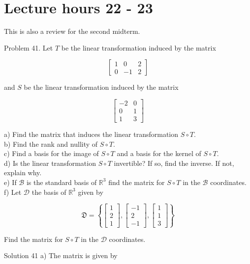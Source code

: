 \documentclass[10pt]{article}
\begin{document}
\section*{Lecture hours 22 - 23}
This is also a review for the second midterm.

Problem 41. Let $T$ be the linear transformation induced by the matrix

$$
\left[\begin{array}{ccc}
1 & 0 & 2 \\
0 & -1 & 2
\end{array}\right]
$$

and $S$ be the linear transformation induced by the matrix

$$
\left[\begin{array}{cc}
-2 & 0 \\
0 & 1 \\
1 & 3
\end{array}\right]
$$

a) Find the matrix that induces the linear transformation $S \circ T$.\\
b) Find the rank and nullity of $S \circ T$.\\
c) Find a basis for the image of $S \circ T$ and a basis for the kernel of $S \circ T$.\\
d) Is the linear transformation $S \circ T$ invertible? If so, find the inverse. If not, explain why.\\
e) If $\mathcal{B}$ is the standard basis of $\mathbb{R}^{3}$ find the matrix for $S \circ T$ in the $\mathcal{B}$ coordinates.\\
f) Let $\mathcal{D}$ the basis of $\mathbb{R}^{3}$ given by

$$
\mathfrak{D}=\left\{\left[\begin{array}{l}
1 \\
2 \\
1
\end{array}\right],\left[\begin{array}{c}
-1 \\
2 \\
-1
\end{array}\right],\left[\begin{array}{l}
1 \\
1 \\
3
\end{array}\right]\right\}
$$

Find the matrix for $S \circ T$ in the $\mathcal{D}$ coordinates.

Solution 41 a) The matrix is given by
\end{document}
